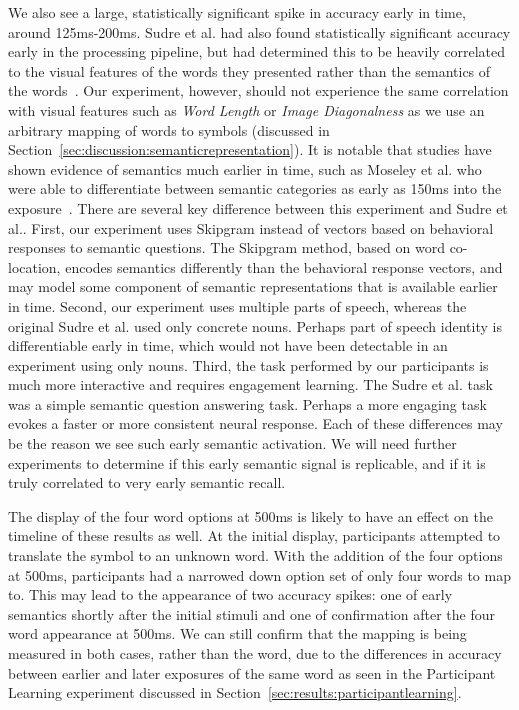 We also see a large, statistically significant spike in \tvt accuracy early in 
time, around 125ms-200ms. Sudre et al. had also found statistically significant 
accuracy early in the processing pipeline, but had determined this to be 
heavily correlated to the visual features of the words they presented rather 
than the semantics of the words~\cite{Sudre2012}. Our experiment, however, 
should not experience the same correlation with visual features such as 
\emph{Word Length} or \emph{Image Diagonalness} as we use an arbitrary mapping 
of words to symbols (discussed in 
Section~\ref{sec:discussion:semanticrepresentation}). It is notable that 
studies have shown evidence of semantics much earlier in time, such as Moseley 
et al. who were able to differentiate between semantic categories as early as 
150ms into the exposure~\cite{moseley2013sensorimotor}. There are several key 
difference between this experiment and Sudre et al..  First, our experiment 
uses Skipgram instead of vectors based on behavioral responses to semantic 
questions. The Skipgram method, based on word co-location, encodes semantics 
differently than the behavioral response vectors, and may model some component 
of semantic representations that is available earlier in time.  Second, our 
experiment uses multiple parts of speech, whereas the original Sudre et al. 
used only concrete nouns.  Perhaps part of speech identity is differentiable 
early in time, which would not have been detectable in an experiment using only 
nouns.  Third, the task performed by our participants is much more interactive 
and requires engagement learning.  The Sudre et al. task was a simple semantic 
question answering task. Perhaps a more engaging task evokes a faster or more 
consistent neural response.  Each of these differences may be the reason we see 
such early semantic activation.  We will need further experiments to determine 
if this early semantic signal is replicable, and if it is truly correlated to 
very early semantic recall.

The display of the four word options at 500ms is likely to have an effect on 
the timeline of these results as well. At the initial display, participants 
attempted to translate the symbol to an unknown word. With the addition of the 
four options at 500ms, participants had a narrowed down option set of only four 
words to map to. This may lead to the appearance of two accuracy spikes: one of 
early semantics shortly after the initial stimuli and one of confirmation after 
the four word appearance at 500ms. We can still confirm that the mapping is 
being measured in both cases, rather than the word, due to the differences in 
\tvt accuracy between earlier and later exposures of the same word as seen in 
the Participant Learning experiment discussed in 
Section~\ref{sec:results:participantlearning}.
